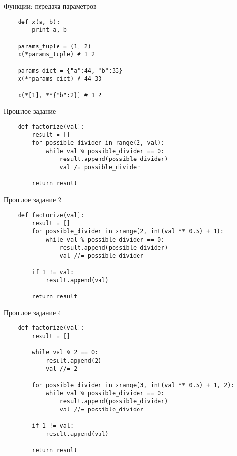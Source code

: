 \documentclass{article}
\begin{document}
{\center Функции: передача параметров}
\vspace{15pt}
\begin{lstlisting}
    def x(a, b):
        print a, b

    params_tuple = (1, 2)
    x(*params_tuple) # 1 2

    params_dict = {"a":44, "b":33}
    x(**params_dict) # 44 33

    x(*[1], **{"b":2}) # 1 2
\end{lstlisting}
\newpage

{\center Прошлое задание}
\begin{lstlisting}
    def factorize(val):
        result = []
        for possible_divider in range(2, val):
            while val % possible_divider == 0:
                result.append(possible_divider)
                val /= possible_divider

        return result
\end{lstlisting}
\newpage

{\center Прошлое задание 2}
\begin{lstlisting}
    def factorize(val):
        result = []
        for possible_divider in xrange(2, int(val ** 0.5) + 1):
            while val % possible_divider == 0:
                result.append(possible_divider)
                val //= possible_divider

        if 1 != val:
            result.append(val)

        return result
\end{lstlisting}
\newpage

{\center Прошлое задание 4}
\begin{lstlisting}
    def factorize(val):
        result = []

        while val % 2 == 0:
            result.append(2)
            val //= 2

        for possible_divider in xrange(3, int(val ** 0.5) + 1, 2):
            while val % possible_divider == 0:
                result.append(possible_divider)
                val //= possible_divider

        if 1 != val:
            result.append(val)

        return result
\end{lstlisting}
\newpage
\end{document}
